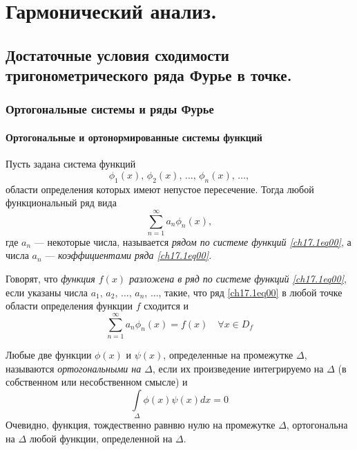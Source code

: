 \part[Гармонический анализ.]{Гармонический анализ.}%

\chapter{Достаточные условия сходимости тригонометрического ряда Фурье в точке.}
\section{Ортогональные системы и ряды Фурье}
\subsection{Ортогональные и ортонормированные системы функций}
Пусть задана система функций 
\begin{equation} \label{ch17.1eq00}
\phi_1(x), \,\phi_2(x), \, \ldots, \, \phi_n(x), \, \ldots,
\end{equation}
области определения которых имеют непустое пересечение. Тогда любой функциональный ряд вида
\begin{equation} \label{ch17.1eq01}
 \sum_{n = 1}^{\infty} a_n \phi_n(x),
 \end{equation}
 где $a_n$ --- некоторые числа, называется \textit{рядом по системе функций \eqref{ch17.1eq00}}, а числа $a_n$ --- \textit{коэффициентами ряда \eqref{ch17.1eq00}.}
 
 Говорят, что \textit{функция $f(x)$ разложена в ряд по системе функций \eqref{ch17.1eq00}}, если указаны числа $a_1, \,a_2, \,\ldots, \, a_n, \,\ldots$, такие, что ряд \eqref{ch17.1eq00} в любой точке области определения функции $f$ сходится и 
 $$
  \sum_{n = 1}^{\infty} a_n \phi_n(x)=f(x) \quad \forall x \in D_f
  $$ 



\begin{defn}
Любые две функции $\phi(x)$	и $\psi(x)$, определенные на промежутке $\Delta$, называются \textit{ортогональными на $\Delta$}, если их произведение интегрируемо на $\Delta$ (в собственном или несобственном смысле) и
$$
\int \limits_\Delta\phi(x) \psi(x)dx=0
$$
Очевидно, функция, тождественно равнвю нулю на промежутке $\Delta$, ортогональна на $\Delta$ любой функции, определенной на $\Delta$.
\end{defn}

